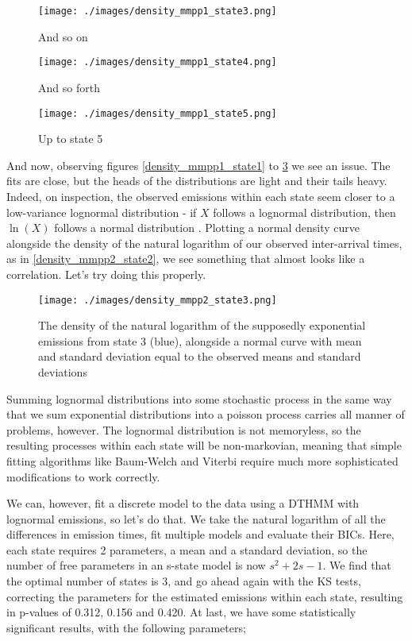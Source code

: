 \begin{figure}[h!]
\texttt{[image: ./images/density\_mmpp1\_state3.png]}
\caption{And so on}
\label{density_mmpp1_state3}
\end{figure}

\begin{figure}[h!]
\texttt{[image: ./images/density\_mmpp1\_state4.png]}
\caption{And so forth}
\label{density_mmpp1_state4}
\end{figure}

\begin{figure}[h!]
\texttt{[image: ./images/density\_mmpp1\_state5.png]}
\caption{Up to state 5}
\label{density_mmpp1_state5}
\end{figure}

And now, observing figures \ref{density_mmpp1_state1} to \ref{density_mmpp1_state5} we see an issue. The fits are close, but the heads of the distributions are light and their tails heavy. Indeed, on inspection, the observed emissions within each state seem closer to a low-variance lognormal distribution - if $X$ follows a lognormal distribution, then $\ln(X)$ follows a normal distribution %
. Plotting a normal density curve alongside the density of the natural logarithm of our observed inter-arrival times, as in \ref{density_mmpp2_state2}, we see something that almost looks like a correlation. Let's try doing this properly.

\begin{figure}[h!]
\texttt{[image: ./images/density\_mmpp2\_state3.png]}
\caption{The density of the natural logarithm of the supposedly exponential emissions from state 3 (blue), alongside a normal curve with mean and standard deviation equal to the observed means and standard deviations}
\label{density_mmpp2_state3}
\end{figure}

Summing lognormal distributions into some stochastic process in the same way that we sum exponential distributions into a poisson process carries all manner of problems, however. The lognormal distribution is not memoryless, so the resulting processes within each state will be non-markovian, meaning that simple fitting algorithms like Baum-Welch and Viterbi require much more sophisticated modifications to work correctly.

We can, however, fit a discrete model to the data using a DTHMM with lognormal emissions, so let's do that. We take the natural logarithm of all the differences in emission times, fit multiple models and evaluate their BICs. Here, each state requires 2 parameters, a mean and a standard deviation, so the number of free parameters in an s-state model is now $s^2+2s-1$. We find that the optimal number of states is 3, and go ahead again with the KS tests, correcting the parameters for the estimated emissions within each state, resulting in p-values of 0.312, 0.156 and 0.420. At last, we have some statistically significant results, with the following parameters;

